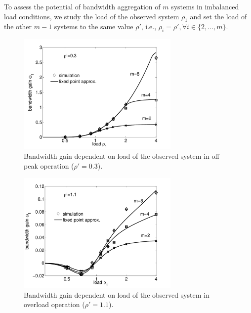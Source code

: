 To assess the potential of bandwidth aggregation of $m$ systems in imbalanced load conditions, we study the load of the observed system $\rho_1$ and set the load of the other $m-1$ systems to the same value $\rho'$, i.e., $\rho_i=\rho',\forall i\in\{2,\dotsc,m\}$.

\begin{figure}[tb]
	\centering
	\includegraphics[width=0.7\textwidth]{aggregation/performance_model/figures/fp_bwgain_rho03}
 	\caption{Bandwidth gain dependent on load of the observed system in off peak operation ($\rho'=0.3$).}
 	\label{fig:fp_bwgain_rho03}
\end{figure}

\begin{figure}[tb]
	\centering
	\includegraphics[width=0.7\textwidth]{aggregation/performance_model/figures/fp_bwgain_rho11}
 	\caption{Bandwidth gain dependent on load of the observed system in overload operation ($\rho'=1.1$).}
 	\label{fig:fp_bwgain_rho11}
\end{figure}


